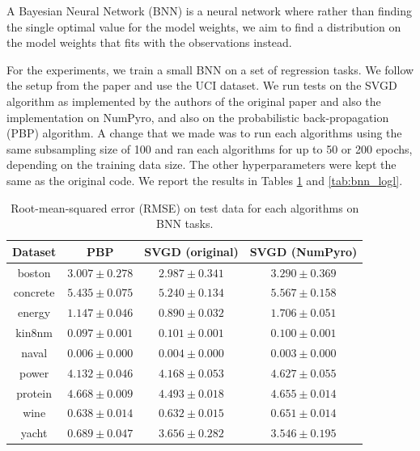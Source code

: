A Bayesian Neural Network (BNN) is a neural network where rather than finding the single optimal value for the model weights, we aim to find a distribution on the model weights that fits with the observations instead.

For the experiments, we train a small BNN on a set of regression tasks. We follow the setup from the paper and use the UCI dataset. We run tests on the SVGD algorithm as implemented by the authors of the original paper and also the implementation on NumPyro, and also on the probabilistic back-propagation (PBP) algorithm. A change that we made was to run each algorithms using the same subsampling size of 100 and ran each algorithms for up to 50 or 200 epochs, depending on the training data size. The other hyperparameters were kept the same as the original code. We report the results in Tables \ref{tab:bnn_rmse} and \ref{tab:bnn_logl}. 

\begin{table}[]
\centering
\caption{Root-mean-squared error (RMSE) on test data for each algorithms on BNN tasks.} 
\label{tab:bnn_rmse}
\begin{tabular}{|c|ccc|}
\hline
 Dataset & PBP & SVGD (original) & SVGD (NumPyro)  \\
 \hline
boston & $3.007 \pm 0.278$ & $2.987 \pm 0.341$ & $3.290 \pm 0.369$ \\
concrete & $5.435 \pm 0.075$ & $5.240 \pm 0.134$ & $5.567 \pm 0.158$ \\
energy & $1.147 \pm 0.046$ & $0.890 \pm 0.032$ & $1.706 \pm 0.051$ \\
kin8nm & $0.097 \pm 0.001$ & $0.101 \pm 0.001$ & $0.100 \pm 0.001$ \\
naval & $0.006 \pm 0.000$ & $0.004 \pm 0.000$ & $0.003 \pm 0.000$ \\
power & $4.132 \pm 0.046$ & $4.168 \pm 0.053$ & $4.627 \pm 0.055$ \\
protein & $4.668 \pm 0.009$ & $4.493 \pm 0.018$ & $4.655 \pm 0.014$ \\
wine & $0.638 \pm 0.014$ & $0.632 \pm 0.015$ & $0.651 \pm 0.014$ \\
yacht & $0.689 \pm 0.047$ & $3.656 \pm 0.282$ & $3.546 \pm 0.195$ \\
\hline
\end{tabular}
\end{table}

